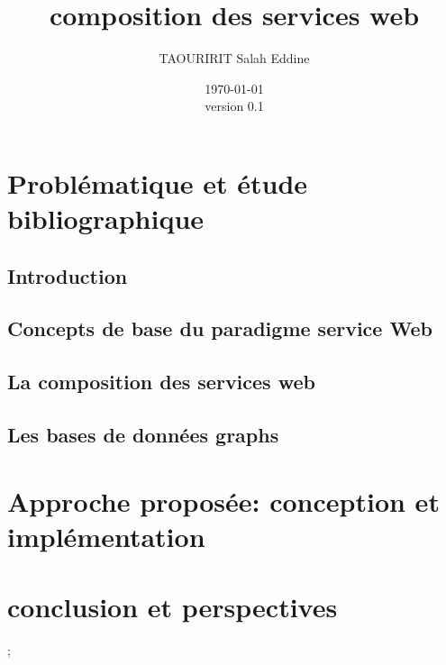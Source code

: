\documentclass[a4paper, 11pt]{report}
\author{TAOURIRIT Salah Eddine}
\title{composition des services web}
\date{\today\\version 0.1}
\begin{document}
\maketitle 
\tableofcontents
{}  

\part{Problématique et étude bibliographique}
    \chapter{Introduction}
    
    \chapter{Concepts de base du paradigme service Web} 
    
    \chapter{La composition des services web}
    \chapter{Les bases de données graphs}
\part{Approche proposée: conception et implémentation}  %
\part{conclusion et perspectives}

;
\end{document}
